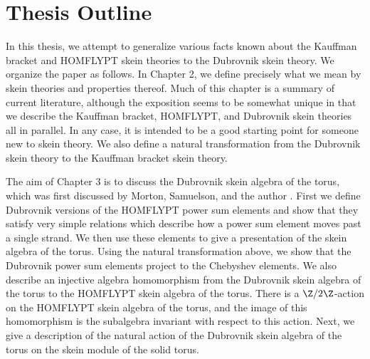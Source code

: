 \section{Thesis Outline}

In this thesis, we attempt to generalize various facts known about the Kauffman bracket and HOMFLYPT skein theories to the Dubrovnik skein theory. We organize the paper as follows. In Chapter 2, we define precisely what we mean by skein theories and properties thereof. Much of this chapter is a summary of current literature, although the exposition seems to be somewhat unique in that we describe the Kauffman bracket, HOMFLYPT, and Dubrovnik skein theories all in parallel. In any case, it is intended to be a good starting point for someone new to skein theory. We also define a natural transformation from the Dubrovnik skein theory to the Kauffman bracket skein theory. 

The aim of Chapter 3 is to discuss the Dubrovnik skein algebra of the torus, which was first discussed by Morton, Samuelson, and the author \cite{MPS20}. First we define Dubrovnik versions of the HOMFLYPT power sum elements and show that they satisfy very simple relations which describe how a power sum element moves past a single strand. We then use these elements to give a presentation of the skein algebra of the torus. Using the natural transformation above, we show that the Dubrovnik power sum elements project to the Chebyshev elements. We also describe an injective algebra homomorphism from the Dubrovnik skein algebra of the torus to the HOMFLYPT skein algebra of the torus. There is a $\Z/2\Z$-action on the HOMFLYPT skein algebra of the torus, and the image of this homomorphism is the subalgebra invariant with respect to this action. Next, we give a description of the natural action of the Dubrovnik skein algebra of the torus on the skein module of the solid torus. 

